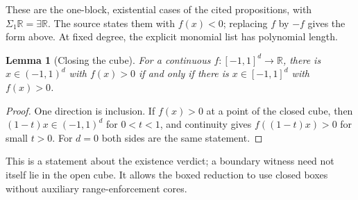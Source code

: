 \documentclass[11pt,a4paper]{article}
\theoremstyle{plain}
\newtheorem{lemma}[theorem]{Lemma}
\theoremstyle{definition}
\theoremstyle{remark}
\newcommand{\ER}{\exists\mathbb{R}}
\newcommand{\R}{\mathbb{R}}
\begin{document}
These are the one-block, existential cases of the cited propositions, with $\Sigma_1\R=\ER$. The source states them with $f(x)<0$; replacing $f$ by $-f$ gives the form above. At fixed degree, the explicit monomial list has polynomial length.

\begin{lemma}[Closing the cube]\label{lem:closing}
For a continuous $f:[-1,1]^d\to\R$, there is $x\in(-1,1)^d$ with $f(x)>0$ if and only if there is $x\in[-1,1]^d$ with $f(x)>0$.
\end{lemma}

\begin{proof}
One direction is inclusion. If $f(x)>0$ at a point of the closed cube, then $(1-t)x\in(-1,1)^d$ for $0<t<1$, and continuity gives $f((1-t)x)>0$ for small $t>0$. For $d=0$ both sides are the same statement.
\end{proof}

This is a statement about the existence verdict; a boundary witness need not itself lie in the open cube. It allows the boxed reduction to use closed boxes without auxiliary range-enforcement cores.
\end{document}
